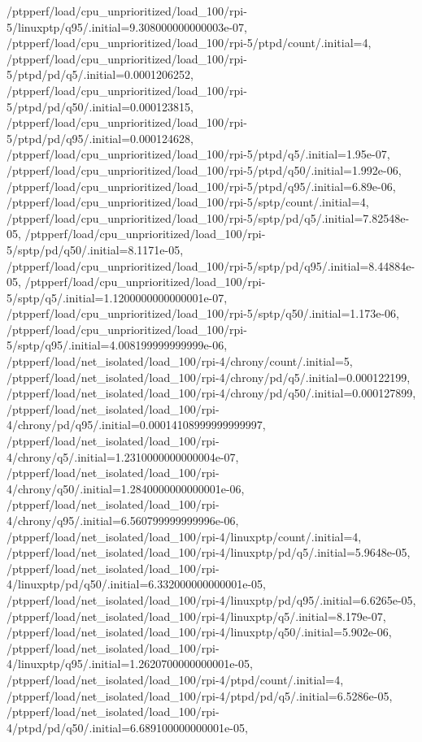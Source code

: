{    /ptpperf/load/cpu_unprioritized/load_100/rpi-5/linuxptp/q95/.initial=9.308000000000003e-07,
    /ptpperf/load/cpu_unprioritized/load_100/rpi-5/ptpd/count/.initial=4,
    /ptpperf/load/cpu_unprioritized/load_100/rpi-5/ptpd/pd/q5/.initial=0.0001206252,
    /ptpperf/load/cpu_unprioritized/load_100/rpi-5/ptpd/pd/q50/.initial=0.000123815,
    /ptpperf/load/cpu_unprioritized/load_100/rpi-5/ptpd/pd/q95/.initial=0.000124628,
    /ptpperf/load/cpu_unprioritized/load_100/rpi-5/ptpd/q5/.initial=1.95e-07,
    /ptpperf/load/cpu_unprioritized/load_100/rpi-5/ptpd/q50/.initial=1.992e-06,
    /ptpperf/load/cpu_unprioritized/load_100/rpi-5/ptpd/q95/.initial=6.89e-06,
    /ptpperf/load/cpu_unprioritized/load_100/rpi-5/sptp/count/.initial=4,
    /ptpperf/load/cpu_unprioritized/load_100/rpi-5/sptp/pd/q5/.initial=7.82548e-05,
    /ptpperf/load/cpu_unprioritized/load_100/rpi-5/sptp/pd/q50/.initial=8.1171e-05,
    /ptpperf/load/cpu_unprioritized/load_100/rpi-5/sptp/pd/q95/.initial=8.44884e-05,
    /ptpperf/load/cpu_unprioritized/load_100/rpi-5/sptp/q5/.initial=1.1200000000000001e-07,
    /ptpperf/load/cpu_unprioritized/load_100/rpi-5/sptp/q50/.initial=1.173e-06,
    /ptpperf/load/cpu_unprioritized/load_100/rpi-5/sptp/q95/.initial=4.008199999999999e-06,
    /ptpperf/load/net_isolated/load_100/rpi-4/chrony/count/.initial=5,
    /ptpperf/load/net_isolated/load_100/rpi-4/chrony/pd/q5/.initial=0.000122199,
    /ptpperf/load/net_isolated/load_100/rpi-4/chrony/pd/q50/.initial=0.000127899,
    /ptpperf/load/net_isolated/load_100/rpi-4/chrony/pd/q95/.initial=0.00014108999999999997,
    /ptpperf/load/net_isolated/load_100/rpi-4/chrony/q5/.initial=1.2310000000000004e-07,
    /ptpperf/load/net_isolated/load_100/rpi-4/chrony/q50/.initial=1.2840000000000001e-06,
    /ptpperf/load/net_isolated/load_100/rpi-4/chrony/q95/.initial=6.560799999999996e-06,
    /ptpperf/load/net_isolated/load_100/rpi-4/linuxptp/count/.initial=4,
    /ptpperf/load/net_isolated/load_100/rpi-4/linuxptp/pd/q5/.initial=5.9648e-05,
    /ptpperf/load/net_isolated/load_100/rpi-4/linuxptp/pd/q50/.initial=6.332000000000001e-05,
    /ptpperf/load/net_isolated/load_100/rpi-4/linuxptp/pd/q95/.initial=6.6265e-05,
    /ptpperf/load/net_isolated/load_100/rpi-4/linuxptp/q5/.initial=8.179e-07,
    /ptpperf/load/net_isolated/load_100/rpi-4/linuxptp/q50/.initial=5.902e-06,
    /ptpperf/load/net_isolated/load_100/rpi-4/linuxptp/q95/.initial=1.2620700000000001e-05,
    /ptpperf/load/net_isolated/load_100/rpi-4/ptpd/count/.initial=4,
    /ptpperf/load/net_isolated/load_100/rpi-4/ptpd/pd/q5/.initial=6.5286e-05,
    /ptpperf/load/net_isolated/load_100/rpi-4/ptpd/pd/q50/.initial=6.689100000000001e-05,
}
